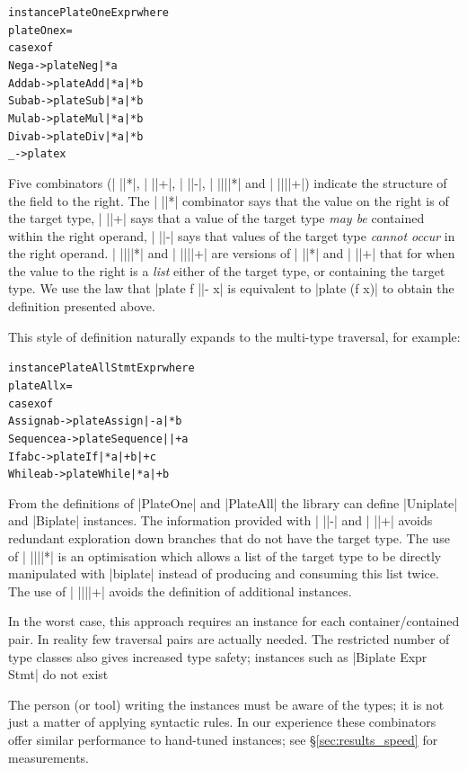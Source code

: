 \documentclass[preprint]{sigplanconf}
\newenvironment{code}{\begin{alltt}\small}{\end{alltt}}
\newcommand{\ignore}{}
\begin{document}
\begin{code}
instance PlateOne Expr where
    plateOne x =
        case x of
            Neg  a    -> plate Neg  |* a
            Add  a b  -> plate Add  |* a |* b
            Sub  a b  -> plate Sub  |* a |* b
            Mul  a b  -> plate Mul  |* a |* b
            Div  a b  -> plate Div  |* a |* b
            _         -> plate x
\end{code}

Five combinators (| ||*|, | ||+|, | ||-|, | ||||*| and | ||||+|) indicate the structure of the field to the right. The | ||*| combinator says that the value on the right is of the target type, | ||+| says that a value of the target type \textit{may be} contained within the right operand, | ||-| says that values of the target type \textit{cannot occur} in the right operand. | ||||*| and | ||||+| are versions of | ||*| and | ||+| that for when the value to the right is a \textit{list} either of the target type, or containing the target type. We use the law that |plate f ||- x| is equivalent to |plate (f x)| to obtain the definition presented above.

This style of definition naturally expands to the multi-type traversal, for example:

\begin{code}
instance PlateAll Stmt Expr where
    plateAll x =
        case x of
            Assign    a b    -> plate Assign    |-   a |*  b
            Sequence  a      -> plate Sequence  ||+  a
            If        a b c  -> plate If        |*   a |+  b |+ c
            While     a b    -> plate While     |*   a |+  b
\end{code}

From the definitions of |PlateOne| and |PlateAll| the library can define |Uniplate| and |Biplate| instances. The information provided with | ||-| and | ||+| avoids redundant exploration down branches that do not have the target type. The use of | ||||*| is an optimisation which allows a list of the target type to be directly manipulated with |biplate| instead of producing and consuming this list twice. The use of | ||||+| avoids the definition of additional instances.

In the worst case, this approach requires an instance for each container/contained pair. In reality few traversal pairs are actually needed. The restricted number of type classes also gives increased type safety; instances such as \ignore|Biplate Expr Stmt| do not exist

The person (or tool) writing the instances must be aware of the types; it is not just a matter of applying syntactic rules. In our experience these combinators offer similar performance to hand-tuned instances; see \S\ref{sec:results_speed} for measurements.
\end{document}
